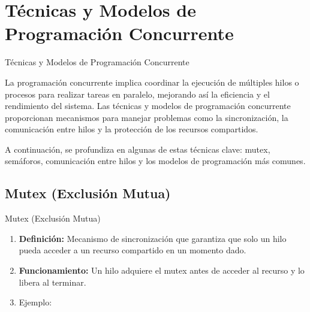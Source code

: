 \documentclass{beamer}
\begin{document}
\section{Técnicas y Modelos de Programación Concurrente}
\begin{frame}{Técnicas y Modelos de Programación Concurrente}

    La programación concurrente implica coordinar la ejecución de múltiples hilos o procesos para realizar tareas en paralelo, mejorando así la eficiencia y el rendimiento del sistema. Las técnicas y modelos de programación concurrente proporcionan mecanismos para manejar problemas como la sincronización, la comunicación entre hilos y la protección de los recursos compartidos.

A continuación, se profundiza en algunas de estas técnicas clave: mutex, semáforos, comunicación entre hilos y los modelos de programación más comunes.
\end{frame}


\subsection{Mutex (Exclusión Mutua)}
\begin{frame}{Mutex (Exclusión Mutua)}

\begin{block}
    \begin{enumerate}
        \item \textbf{Definición:} Mecanismo de sincronización que garantiza que solo un hilo pueda acceder a un recurso compartido en un momento dado. \pause
        \item \textbf{Funcionamiento:} Un hilo adquiere el mutex antes de acceder al recurso y lo libera al terminar. \pause
        \item Ejemplo: 
    \end{enumerate}
\end{block}
\end{frame}
\end{document}
